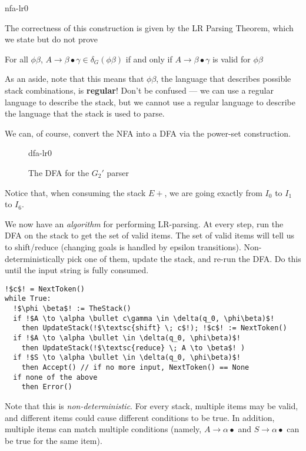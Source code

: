 \begin{center}
    {nfa-lr0}
\end{center}

The correctness of this construction is given by the LR Parsing Theorem, which we state but do not prove

\begin{theorem}
    For all $\phi\beta$, $A \to \beta\bullet\gamma \in \delta_G(\phi\beta)$ if and only if $A \to \beta\bullet\gamma$ is valid for $\phi\beta$ 
\end{theorem}

As an aside, note that this means that $\phi\beta$, the language that describes possible stack combinations, is \textbf{regular}! Don't be confused --- we can use a regular language to describe the stack, but we cannot use a regular language to describe the language that the stack is used to parse. 

We can, of course, convert the NFA into a DFA via the power-set construction. 

\begin{figure}[H]
    \centering
    {dfa-lr0}
    \caption{The DFA for the $G_2'$ parser}
    \label{fig:dfa-lr0}
\end{figure}

Notice that, when consuming the stack $E+$, we are going exactly from $I_0$ to $I_1$ to $I_6$.

We now have an \textit{algorithm} for performing LR-parsing. At every step, run the DFA on the stack to get the set of valid items. The set of valid items will tell us to shift/reduce (changing goals is handled by epsilon transitions). Non-deterministically pick one of them, update the stack, and re-run the DFA. Do this until the input string is fully consumed. 

\begin{code}
\begin{lstlisting}[style=pseudocode]
!$c$! = NextToken()
while True:
  !$\phi \beta$! := TheStack()
  if !$A \to \alpha \bullet c\gamma \in \delta(q_0, \phi\beta)$!
    then UpdateStack(!$\textsc{shift} \; c$!); !$c$! := NextToken()
  if !$A \to \alpha \bullet \in \delta(q_0, \phi\beta)$!
    then UpdateStack(!$\textsc{reduce} \; A \to \beta$! )
  if !$S \to \alpha \bullet \in \delta(q_0, \phi\beta)$!
    then Accept() // if no more input, NextToken() == None
  if none of the above
    then Error()
\end{lstlisting} 
\vspace{3mm}
\end{code}
Note that this is \textit{non-deterministic}. For every stack, multiple items may be valid, and different items could cause different conditions to be true. In addition, multiple items can match multiple conditions (namely, $A \to \alpha \bullet$ and $S \to \alpha \bullet$ can be true for the same item).

